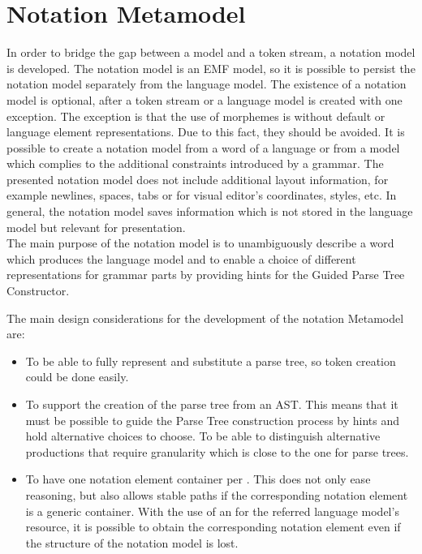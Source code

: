 \section{Notation Metamodel} \label{chp:NotMM}
In order to bridge the gap between a model and a token stream, a notation model is developed. The notation model is an EMF model, so it is possible to persist the notation model separately from the language model. The existence of a notation model is optional, after a token stream or a language model is created with one exception. The exception is that the use of morphemes is without default or language element representations. Due to this fact, they should be avoided. It is possible to create a notation model from a word of a language or from a model which complies to the additional constraints introduced by a grammar. The presented notation model does not include additional layout information, for example newlines, spaces, tabs or for visual editor's coordinates, styles, etc. In general, the notation model saves information which is not stored in the language model but relevant for presentation.\\

The main purpose of the notation model is to unambiguously describe a word which produces the language model and to enable a choice of different representations for grammar parts by providing hints for the Guided Parse Tree Constructor.

The main design considerations for the development of the notation Metamodel are:
\begin{itemize}
	\item To be able to fully represent and substitute a parse tree, so token creation could be done easily.
	\item To support the creation of the parse tree from an AST. This means that it must be possible to guide the Parse Tree construction process by hints and hold alternative choices to choose. To be able to distinguish alternative productions that require granularity which is close to the one for parse trees.
	\item To have one notation element container per . This does not only ease reasoning, but also allows stable paths if the corresponding notation element is a generic container. With the use of an  for the referred language model's resource, it is possible to obtain the corresponding notation element even if the structure of the notation model is lost. 
\end{itemize}

